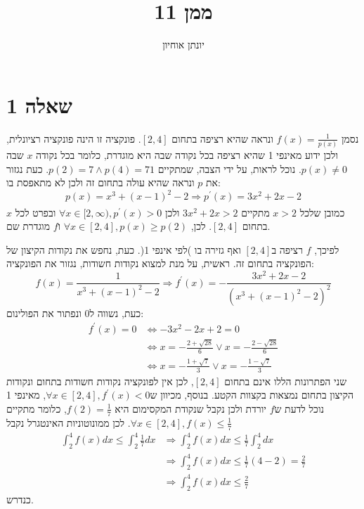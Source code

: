 \documentclass[11pt, oneside]{article}
\title{ממן 11}
\author{יונתן אוחיון}
\newcommand{\qed}{\R{$\blacksquare$}}
\newcommand{\br}{\\\\\\\\\\\\\\}
\newcommand{\logr}[1]{\underset{\text{#1}}{\Longrightarrow}}
\newcommand{\defi}[3]{\int_{#1}^{#2} #3}
\begin{document}
\maketitle
\clearpage
\section*{שאלה 1}
נסמן $f(x) = \frac{1}{p(x)}$ ונראה שהיא רציפה בתחום $[2, 4]$. פונקציה זו הינה פונקציה רציונלית, ולכן ידוע מאינפי 1 שהיא רציפה בכל נקודה שבה היא מוגדרת, כלומר בכל נקודה $x$ שבה $p(x) \neq 0$. נוכל לראות, על ידי הצבה, שמתקיים $p(2) = 7 \land p(4) = 71$. כעת נגזור את $p$ ונראה שהיא עולה בתחום זה ולכן לא מתאפסת בו:
\[
p(x) = x^{3} + (x - 1)^{2} - 2
\logr{}
p^{\prime}(x) = 3x^{2} + 2x - 2
\]
כמובן שלכל $x > 2$ מתקיים $3x^{2} + 2x > 2$ ולכן $\forall x \in [2, \infty), p^{\prime}(x) > 0$ ובפרט לכל $x$ בתחום $[2, 4]$. לכן, $\forall x \in [2, 4], p(x) \ge p(2)$ ו$f$ מוגדרת שם.

לפיכך, $f$ רציפה ב$[2, 4]$ ואף גזירה בו )לפי אינפי 1(. כעת, נחפש את נקודות הקיצון של הפונקציה בתחום זה. ראשית, על מנת למצוא נקודות חשודות, נגזור את הפונקציה:
\[
f(x) = \frac{1}{x^{3} + (x - 1)^{2} - 2}
\logr{}
f^{\prime}(x) = -\frac{3x^{2} + 2x - 2}{(x^{3} + (x - 1)^{2} - 2)^{2}}
\]
כעת, נשווה ל0 ונפתור את הפולינום:
\begin{align*}
f^{\prime}(x) = 0
&\iff -3x^{2} - 2x + 2 = 0\\
&\iff x = -\frac{2 + \sqrt{28}}{6} \lor x = -\frac{2 - \sqrt{28}}{6}\\
&\iff x = -\frac{1 + \sqrt{7}}{3} \lor x = -\frac{1 - \sqrt{7}}{3}
\end{align*}
שני הפתרונות הללו אינם בתחום $[2, 4]$, לכן אין לפונקציה נקודות חשודות בתחום ונקודות הקיצון בתחום נמצאות בקצוות הקטע. בנוסף, מכיוון ש$\forall x \in [2, 4], f^{\prime}(x) < 0$, מאינפי 1 נוכל לדעת ש$f$ יורדת ולכן נקבל שנקודת המקסימום היא $f(2) = \frac{1}{7}$, כלומר מתקיים $\forall x \in [2, 4], f(x) \le \frac{1}{7}$. לכן ממונוטוניות האינטגרל נקבל
\begin{align*}
\defi{2}{4}{f(x)dx} \le \defi{2}{4}{\frac{1}{7}dx}
& \logr{}
\defi{2}{4}{f(x)dx} \le \frac{1}{7}\defi{2}{4}{dx}\\
& \logr{}
\defi{2}{4}{f(x)dx} \le \frac{1}{7}(4 - 2) = \frac{2}{7}\\
& \logr{}
\defi{2}{4}{f(x)dx} \le \frac{2}{7}
\end{align*}
כנדרש.
\br\qed
\clearpage
\end{document}
